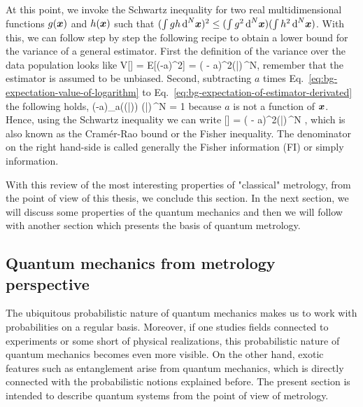 At this point, we invoke the Schwartz inequality for two real multidimensional functions $g(\boldsymbol{x})$ and $h(\boldsymbol{x})$ such that $(\int g h \,\text{d}^N\boldsymbol{x})^2\leq (\int g^2 \,\text{d}^N\boldsymbol{x}) (\int h^2 \,\text{d}^N\boldsymbol{x})$.
With this, we can follow step by step the following recipe to obtain a lower bound for the variance of a general estimator.
First the definition of the variance over the data population looks like
\be
  V[] = E[(-a)^2] = \int ( - a)^2\prob(|)\,^N,
\ee
remember that the estimator is assumed to be unbiased.
Second, subtracting $a$ times Eq.~\eqref{eq:bg-expectation-value-of-logarithm} to Eq.~\eqref{eq:bg-expectation-of-estimator-derivated} the following holds,
\be
  \int (-a)\partial_a\big(\ln  \prob(|)\big) \prob(|)\,^N = 1
\ee
because $a$ is not a function of $\boldsymbol{x}$.
Hence, using the Schwartz inequality we can write
\be
  \label{eq:bg-classical-cr-bound-and-fi}
  [] = \int ( - a)^2\prob(|)\,^N \geq {},
\ee
which is also known as the Cram\'er-Rao bound or the Fisher inequality.
The denominator on the right hand-side is called generally the Fisher information (FI) or simply information.

With this review of the most interesting properties of "classical" metrology, from the point of view of this thesis, we conclude this section.
In the next section, we will discuss some properties of the quantum mechanics and then we will follow with another section which presents the basis of quantum metrology.

\subsection{Quantum mechanics from metrology perspective}
\label{sec:bg-quantum-mechanics-for-metrology}

The ubiquitous probabilistic nature of quantum mechanics makes us to work with probabilities on a regular basis.
Moreover, if one studies fields connected to experiments or some short of physical realizations, this probabilistic nature of quantum mechanics becomes even more visible.
On the other hand, exotic features such as entanglement arise from quantum mechanics, which is directly connected with the probabilistic notions explained before.
The present section is intended to describe quantum systems from the point of view of metrology.

